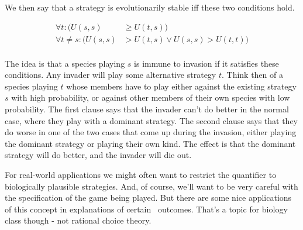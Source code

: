 We then say that a strategy is evolutionarily stable iff these two conditions hold.

\begin{align*}
\forall t: (U(s, s) &\geq U(t, s)) \\
\forall t \neq s: (U(s, s) &> U(t, s) \vee U(s, s) > U(t, t))\\
\end{align*}

\noindent The idea is that a species playing $s$ is immune to invasion if it satisfies these conditions. Any invader will play some alternative strategy $t$. Think then of a species playing $t$ whose members have to play either against the existing strategy $s$ with high probability, or against other members of their own species with low probability. The first clause says that the invader can't do better in the normal case, where they play with a dominant strategy. The second clause says that they do worse in one of the two cases that come up during the invasion, either playing the dominant strategy or playing their own kind. The effect is that the dominant strategy will do better, and the invader will die out.

For real-world applications we might often want to restrict the quantifier to biologically plausible strategies. And, of course, we'll want to be very careful with the specification of the game being played. But there are some nice applications of this concept in explanations of certain \eqm\ outcomes. That's a topic for biology class though - not rational choice theory.



